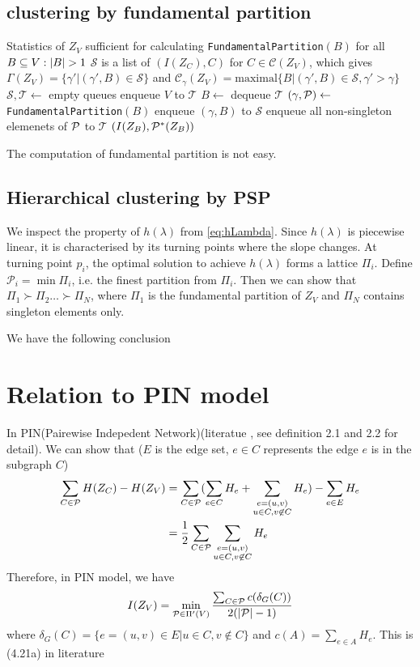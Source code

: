 \documentclass{article}
\begin{document}
\subsection{clustering by fundamental partition}
\begin{algorithm}
\begin{algorithmic}[1]
\REQUIRE Statistics of $Z_V$ sufficient for calculating \texttt{FundamentalPartition}$(B)$ for all $B \subseteq V:\abs{B}>1$
\ENSURE $\mathcal{S}$ is a list of $(I(Z_C),C)$ for $ C \in \mathcal{C}(Z_V)$, which gives
$\Gamma(Z_V) = \{ \gamma' | (\gamma', B) \in \mathcal{S}\} $ and $ \mathcal{C}_{\gamma}(Z_V)
= \mathrm{maximal}\{B | (\gamma', B) \in \mathcal{S}, \gamma' > \gamma \}$
\STATE $\mathcal{S},\mathcal{T} \leftarrow$ empty queues
\STATE enqueue $V$ to $\mathcal{T}$
\STATE $B \leftarrow $ dequeue $\mathcal{T}$
\STATE $(\gamma, \P) \leftarrow$\texttt{FundamentalPartition}$(B)$
\STATE enqueue $(\gamma, B)$ to $\mathcal{S}$
\STATE enqueue all non-singleton elemenets of $\P$ to $\mathcal{T}$
\ENDWHILE
{}
  \RETURN $(I(Z_B), \P^*(Z_B))$
\ENDFUNCTION
\end{algorithmic}
\end{algorithm}

The computation of fundamental partition is not easy.
\subsection{Hierarchical clustering by PSP}
We inspect the property of $h(\lambda)$ from \eqref{eq:hLambda}. Since $h(\lambda)$ is piecewise linear, it is characterised by its turning points where the slope changes.
At turning point $p_i$, the optimal solution to achieve $h(\lambda)$ forms a lattice $\Pi_i$.
Define $\mathcal{P}_i = \min \Pi_i$, i.e. the finest partition from $\Pi_i$. Then we can show that
$\Pi_1 \succ \Pi_2 \dots \succ \Pi_N$, where $\Pi_1$ is the fundamental partition of $Z_V$ and $\Pi_N$ contains singleton elements only.

We have the following conclusion
\section{Relation to PIN model}
In PIN(Pairewise Indepedent Network)(literatue \cite{pin}, see definition 2.1 and 2.2 for detail).
We can show that ($E$ is the edge set, $e \in C$ represents the edge $e$ is in the subgraph $C$)
\begin{align*}
\sum_{C \in \P} H(Z_C) - H(Z_V) & = \sum_{C \in \P} (\sum_{e \in C} H_e + \sum_{\substack{e = (u,v) \\ u \in C, v\not\in C }} H_e) - \sum_{e \in E} H_e \\
& = {1 \over 2}\sum_{C \in \P}  \sum_{\substack{e = (u,v) \\ u \in C, v\not\in C }} H_e
\end{align*}
Therefore, in PIN model, we have
\begin{equation}
I(Z_V) = \min_{ \P \in \Pi'(V)} \frac{ \sum_{C \in \P} c(\delta_{G}(C))}{2(\abs{\P} - 1 )}
\end{equation}
where $\delta_{G}(C) = \{e = (u, v) \in E | u \in C, v \not\in C\} $ and $c(A) = \sum_{e\in A} H_e$.
This is (4.21a) in literature \cite{ic}
\end{document}
